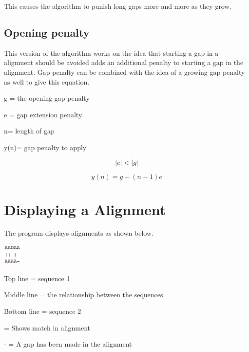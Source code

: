 \documentclass{cmppgr}
\begin{document}
	This causes the algorithm to punish long gaps more and more as they grow.
	
	\subsection{Opening penalty}
	This version of the algorithm works on the idea that starting a gap in a alignment should be avoided adds an additional penalty to starting a gap in the alignment. Gap penalty can be combined with the idea of a growing gap penalty as well to give this equation.
	
	
	g =	the opening gap penalty
	
	
	e =	gap extension penalty 
	
	
	n= length of gap 
	
	y(n)= gap penalty to apply 
	
	\[ |e| < |g| \]
	
	\[y (n) = g + (n − 1) e\]
	
	\section{Displaying a Alignment}
	The program displays alignments as shown below.
	
	\includegraphics[width=1cm]{alignment.png}
	
	Top line = sequence 1
	
	Middle line = the relationship between the sequences 
	
	Bottom line = sequence 2
	
	 \textbar	= Shows match in alignment

	- = A gap has been made in the alignment 
	
	
\end{document}
